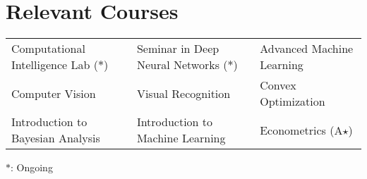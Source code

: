 \setlength\extrarowheight{3pt}  %

\section*{Relevant Courses}
\begin{tabularx}{\textwidth}{L L L}
    Computational Intelligence Lab ($\ast$)&
    Seminar in Deep Neural Networks ($\ast$)&
    Advanced Machine Learning\\
    Computer Vision&
    Visual Recognition&
    Convex Optimization\\
    Introduction to Bayesian Analysis&
    Introduction to Machine Learning&
    Econometrics (A$\star$)
\end{tabularx}

\vspace{2mm}
{\small $\ast$: Ongoing}
